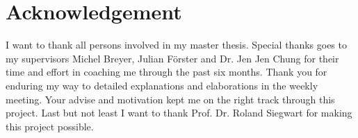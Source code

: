 \chapter*{Acknowledgement}

I want to thank all persons involved in my master thesis. Special thanks goes to my supervisors 	
Michel Breyer, Julian Förster and  Dr. Jen Jen Chung for their time and effort in coaching me through the past six months. Thank you for enduring my way to detailed explanations and elaborations in the weekly meeting. Your advise and motivation kept me on the right track through this project. Last but not least I want to thank Prof. Dr. Roland Siegwart for making this project possible. 